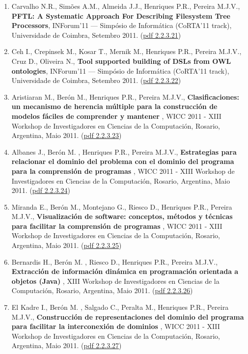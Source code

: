 \documentclass[11pt]{article}
\begin{document}
\begin{enumerate}
\item {Carvalho N.R., Simões A.M., Almeida J.J., Henriques P.R., Pereira M.J.V., {\bf{ PFTL: A Systematic Approach For Describing Filesystem Tree Processors}}, INForum'11 --- Simpósio de Informática (CoRTA'11 track), Universidade de Coimbra, Setembro 2011. (\href{run:Publicacoes/publicacoes/56.pdf}{pdf 2.2.3.21})}
\item {Ceh I., Crepinsek M., Kosar T., Mernik M., Henriques P.R., Pereira M.J.V., Cruz D., Oliveira N.,{\bf{ Tool supported building of {DSL}}s from {OWL} ontologies}, INForum'11 --- Simpósio de Informática (CoRTA'11 track), Universidade de Coimbra, Setembro 2011. (\href{run:Publicacoes/publicacoes/59.pdf}{pdf 2.2.3.22})}
\item {Aristiaran M.,  Berón M., Henriques P.R., Pereira M.J.V., {\bf{ Clasificaciones: un mecanismo de herencia múltiple para la construcción de modelos fáciles de comprender y mantener}} , WICC 2011 - XIII Workshop de Investigadores en Ciencias de la Computación, Rosario, Argentina, Maio 2011. (\href{run:Publicacoes/publicacoes/60.pdf}{pdf 2.2.3.23})}
\item {Albanes J.,  Berón M. , Henriques P.R., Pereira M.J.V., {\bf{ Estrategias para relacionar el dominio del problema con el dominio del programa para la comprensión de programas}} , WICC 2011 - XIII Workshop de Investigadores en Ciencias de la Computación, Rosario, Argentina, Maio 2011. (\href{run:Publicacoes/publicacoes/57.pdf}{pdf 2.2.3.24})}
\item {Miranda E., Berón M., Montejano G., Riesco D., Henriques P.R., Pereira M.J.V., {\bf{ Visualización de software: conceptos, métodos y técnicas para facilitar la comprensión de programas}} , WICC 2011 - XIII Workshop de Investigadores en Ciencias de la Computación, Rosario, Argentina, Maio 2011. (\href{run:Publicacoes/publicacoes/58.pdf}{pdf 2.2.3.25})}
\item {Bernardis H.,  Berón M. , Riesco D., Henriques P.R., Pereira M.J.V., {\bf{ Extracción de información dinámica en programación orientada a objetos (Java)}} , XIII Workshop de Investigadores en Ciencias de la Computación, Rosario, Argentina, Maio 2011. (\href{run:Publicacoes/publicacoes/62.pdf}{pdf 2.2.3.26})}
\item {El Kadre I.,  Berón M. , Salgado C., Peralta M., Henriques P.R., Pereira M.J.V., {\bf{ Construcción de representaciones del dominio del programa para facilitar la interconexión de dominios}} , WICC 2011 - XIII Workshop de Investigadores en Ciencias de la Computación, Rosario, Argentina, Maio 2011. (\href{run:Publicacoes/publicacoes/61.pdf}{pdf 2.2.3.27})}

\end{enumerate}
\end{document}
